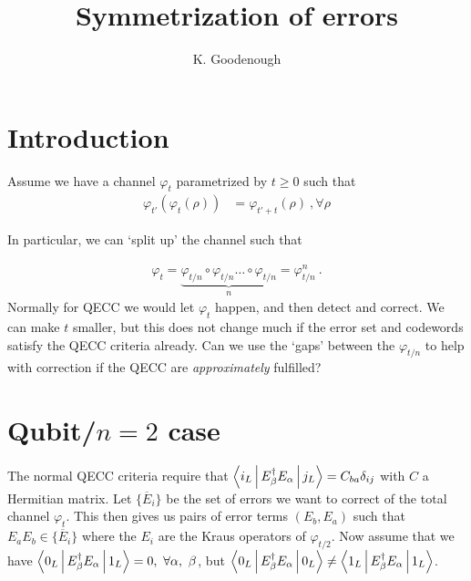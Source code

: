 \documentclass[twoside]{article}
\begin{document}
\title{Symmetrization of errors}
\author{K. Goodenough}
\maketitle
\nonumber
\section{Introduction}
Assume we have a channel $\varphi_t$ parametrized by $t\geq 0$ such that 
\begin{align}
\varphi_{t'}\left(\varphi_t(\rho)\right) &= \varphi_{t'+t}(\rho)\ ,\forall \rho
\end{align}

In particular, we can `split up' the channel such that

\begin{align}
\varphi_{t} = \underbrace{\varphi_{t/n}\circ \varphi_{t/n}\ldots \circ \varphi_{t/n}}_{n} = \varphi_{t/n}^n\ .
\end{align}
Normally for QECC we would let $\varphi_t$ happen, and then detect and correct. We can make $t$ smaller, but this does not change much if the error set and codewords satisfy the QECC criteria already. Can we use the `gaps' between the $\varphi_{t/n}$ to help with correction if the QECC are \emph{approximately} fulfilled? 

\section{Qubit/$n = 2$ case}
The normal QECC criteria require that $\Braket{i_L|E^{\dag}_{\beta}E_{\alpha}|j_L} = C_{ba}\delta_{ij}$ with $C$ a Hermitian matrix. Let $\lbrace{\overline{E}_i\rbrace}$ be the set of errors we want to correct of the total channel $\varphi_t$. This then gives us pairs of error terms $(E_b,E_a)$ such that $E_aE_b \in \lbrace{\overline{E}_i\rbrace}$ where the $E_i$ are the Kraus operators of $\varphi_{t/2}$. Now assume that we have $\Braket{0_L|E^{\dag}_{\beta}E_{\alpha}|1_L} = 0,~\forall \alpha,~\beta$, but $\Braket{0_L|E^{\dag}_{\beta}E_{\alpha}|0_L} \neq \Braket{1_L|E^{\dag}_{\beta}E_{\alpha}|1_L}$. %
\end{document}
